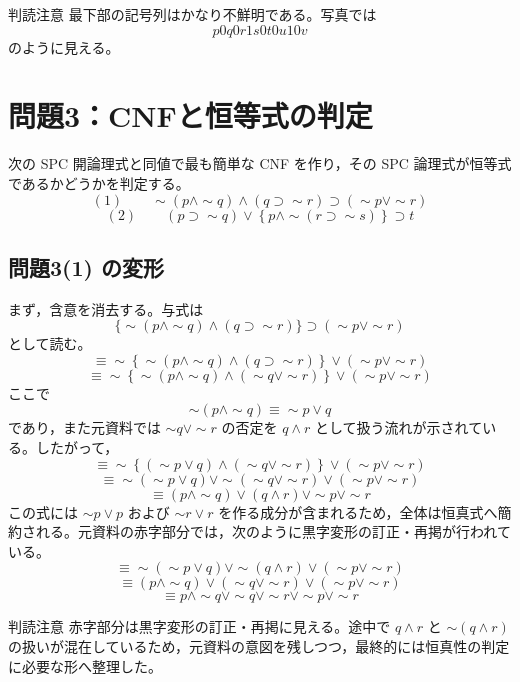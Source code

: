 \documentclass[../main.tex]{subfiles}
\begin{document}
\begin{sidebox}[TBred]{判読注意}
  最下部の記号列はかなり不鮮明である。写真では
  \[
    p0q0r1s0t0u10v
  \]
  のように見える。
\end{sidebox}

\section{問題3：CNFと恒等式の判定}

次の SPC 開論理式と同値で最も簡単な CNF を作り，その SPC 論理式が恒等式であるかどうかを判定する。
\[
  (1)
  \qquad
  \sim(p \land \sim q)
  \land
  (q \supset \sim r)
  \supset
  (\sim p \lor \sim r)
\]
\[
  (2)
  \qquad
  (p \supset \sim q)
  \lor
  \left\{
    p \land \sim(r \supset \sim s)
  \right\}
  \supset t
\]

\subsection{問題3(1) の変形}

まず，含意を消去する。与式は
\[
  \{\sim(p \land \sim q) \land (q \supset \sim r)\}
  \supset
  (\sim p \lor \sim r)
\]
として読む。
\[
  \equiv
  \sim\left\{
    \sim(p \land \sim q)
    \land
    (q \supset \sim r)
  \right\}
  \lor
  (\sim p \lor \sim r)
\]
\[
  \equiv
  \sim\left\{
    \sim(p \land \sim q)
    \land
    (\sim q \lor \sim r)
  \right\}
  \lor
  (\sim p \lor \sim r)
\]
ここで
\[
  \sim(p \land \sim q)
  \equiv
  \sim p \lor q
\]
であり，また元資料では \(\sim q \lor \sim r\) の否定を \(q \land r\) として扱う流れが示されている。したがって，
\[
  \equiv
  \sim\left\{
    (\sim p \lor q)
    \land
    (\sim q \lor \sim r)
  \right\}
  \lor
  (\sim p \lor \sim r)
\]
\[
  \equiv
  \sim(\sim p \lor q)
  \lor
  \sim(\sim q \lor \sim r)
  \lor
  (\sim p \lor \sim r)
\]
\[
  \equiv
  (p \land \sim q)
  \lor
  (q \land r)
  \lor
  \sim p
  \lor
  \sim r
\]
この式には \(\sim p \lor p\) および \(\sim r \lor r\) を作る成分が含まれるため，全体は恒真式へ簡約される。元資料の赤字部分では，次のように黒字変形の訂正・再掲が行われている。
\[
  \equiv
  \sim(\sim p \lor q)
  \lor
  \sim(q \land r)
  \lor
  (\sim p \lor \sim r)
\]
\[
  \equiv
  (p \land \sim q)
  \lor
  (\sim q \lor \sim r)
  \lor
  (\sim p \lor \sim r)
\]
\[
  \equiv
  p \land \sim q
  \lor
  \sim q
  \lor
  \sim r
  \lor
  \sim p
  \lor
  \sim r
\]

\begin{sidebox}[TBred]{判読注意}
  赤字部分は黒字変形の訂正・再掲に見える。途中で \(q \land r\) と \(\sim(q\land r)\) の扱いが混在しているため，元資料の意図を残しつつ，最終的には恒真性の判定に必要な形へ整理した。
\end{sidebox}
\end{document}
